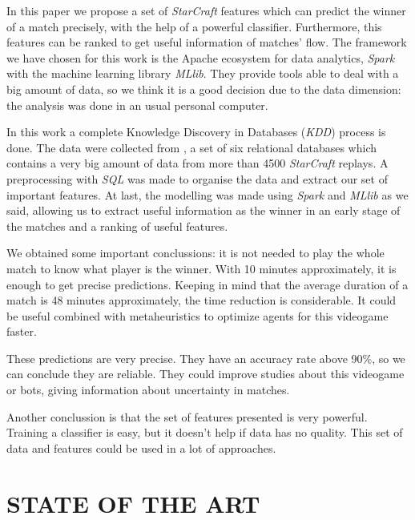 \documentclass[a4paper,twoside]{article}
\begin{document}

In this paper we propose a set of \emph{StarCraft} features which can predict
the winner of a match precisely, with the help of a powerful classifier.
Furthermore, this features can be ranked to
get useful information of matches' flow. The framework we have chosen for this
work is the Apache ecosystem for data analytics, \emph{Spark} with the machine
learning library \emph{MLlib}. They provide tools able to deal with a big
amount of data, so we think it is a good decision due to the data dimension:
the analysis was done in an usual personal computer.


In this work a complete Knowledge Discovery in Databases (\emph{KDD}) process
is done. The data were collected from \cite{DBLP:conf/flairs/RobertsonW14},
a set of six relational databases which contains a very big amount of data
from more than 4500 \emph{StarCraft} replays. A preprocessing with \emph{SQL}
was made to organise the data and extract our set of important features. At
last, the modelling was made using \emph{Spark} and \emph{MLlib} as we said,
allowing us to extract useful information as the winner in an early stage of
the matches and a ranking of useful features.


We obtained some important conclussions: it is not needed to play the whole
match to know what player is the winner. With 10 minutes approximately, it is
enough to get precise predictions. Keeping in mind that the average duration
of a match is 48 minutes approximately, the time reduction is considerable. It
could be useful combined with metaheuristics to optimize agents for this
videogame faster.

These predictions are very precise. They have an accuracy rate above 90\%, so
we can conclude they are reliable. They could improve studies about this
videogame or bots, giving information about uncertainty in matches.

Another conclussion is that the set of features presented is very powerful.
Training a classifier is easy, but it doesn't help if data has no quality.
This set of data and features could be used in a lot of approaches.

\section{\uppercase{State of the art}}
\label{sec:state}
\end{document}
